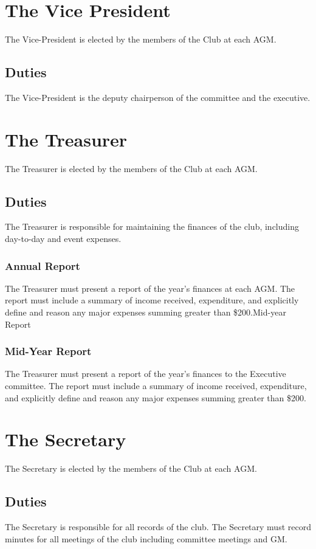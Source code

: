 \documentclass[11pt]{article}
\begin{document}
\section{The Vice President}
The Vice-President is elected by the members of the Club at each AGM.
\subsection{Duties}
The Vice-President is the deputy chairperson of the committee and the executive.

\section{The Treasurer}
The Treasurer is elected by the members of the Club at each AGM.
\subsection{Duties}
The Treasurer is responsible for maintaining the finances of the club, including day-to-day and event expenses. 
\subsubsection{Annual Report}
The Treasurer must present a report of the year’s finances at each AGM. The report must include a summary of income received, expenditure, and explicitly define and reason any major expenses summing greater than \$200.Mid-year Report
\subsubsection{Mid-Year Report}
The Treasurer must present a report of the year’s finances to the Executive committee. The report must include a summary of income received, expenditure, and explicitly define and reason any major expenses summing greater than \$200.

\section{The Secretary}
The Secretary is elected by the members of the Club at each AGM.
\subsection{Duties}
The Secretary is responsible for all records of the club. The Secretary must record minutes for all meetings of the club including committee meetings and GM.
\end{document}
